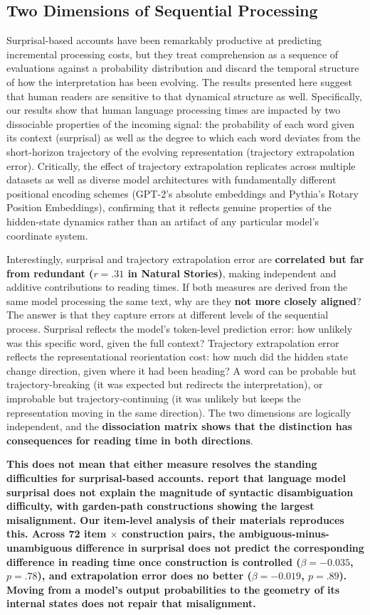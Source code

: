 \documentclass[12pt]{article}
\newcommand{\new}[1]{{\bfseries #1}}
\begin{document}
\subsection{Two Dimensions of Sequential Processing}

Surprisal-based accounts have been remarkably productive at predicting incremental processing costs, but they treat comprehension as a sequence of evaluations against a probability distribution and discard the temporal structure of how the interpretation has been evolving. The results presented here suggest that human readers are sensitive to that dynamical structure as well. Specifically, our results show that human language processing times are impacted by two dissociable properties of the incoming signal: the probability of each word given its context (surprisal) as well as the degree to which each word deviates from the short-horizon trajectory of the evolving representation (trajectory extrapolation error). Critically, the effect of trajectory extrapolation replicates across multiple datasets as well as diverse model architectures with fundamentally different positional encoding schemes (GPT-2's absolute embeddings and Pythia's Rotary Position Embeddings), confirming that it reflects genuine properties of the hidden-state dynamics rather than an artifact of any particular model's coordinate system.

Interestingly, surprisal and trajectory extrapolation error are \new{correlated but far from redundant ($r = .31$ in Natural Stories)}, making independent and additive contributions to reading times. If both measures are derived from the same model processing the same text, why are they \new{not more closely aligned}? The answer is that they capture errors at different levels of the sequential process. Surprisal reflects the model's token-level prediction error: how unlikely was this specific word, given the full context? Trajectory extrapolation error reflects the representational reorientation cost: how much did the hidden state change direction, given where it had been heading? A word can be probable but trajectory-breaking (it was expected but redirects the interpretation), or improbable but trajectory-continuing (it was unlikely but keeps the representation moving in the same direction). The two dimensions are logically independent, and the \new{dissociation matrix shows that the distinction has consequences for reading time in both directions}.

\new{This does not mean that either measure resolves the standing difficulties for surprisal-based accounts. \citet{huang2024} report that language model surprisal does not explain the magnitude of syntactic disambiguation difficulty, with garden-path constructions showing the largest misalignment. Our item-level analysis of their materials reproduces this. Across 72 item $\times$ construction pairs, the ambiguous-minus-unambiguous difference in surprisal does not predict the corresponding difference in reading time once construction is controlled ($\beta = -0.035$, $p = .78$), and extrapolation error does no better ($\beta = -0.019$, $p = .89$). Moving from a model's output probabilities to the geometry of its internal states does not repair that misalignment.}
\end{document}
